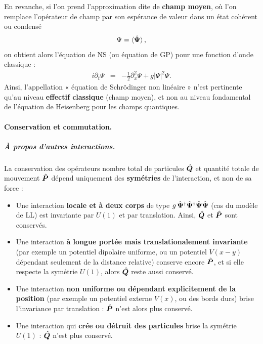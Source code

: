 \medskip

En revanche, si l’on prend l’approximation dite de {\bf champ moyen}, où l’on remplace l’opérateur de champ par son espérance de valeur dans un état cohérent ou condensé
\begin{eqnarray}
	\Psi = \braket{\hat{\bm{\Psi}}},		
\end{eqnarray}
on obtient alors l’équation de \gls{NS} (ou équation de  \gls{GP}) pour une fonction d’onde classique :
\begin{eqnarray}\label{chap.1:eq.GP.2}
	i \partial_t \Psi	 & = & - \frac{1}{2}\partial_x^2 \Psi + g \vert \Psi \vert^2  \Psi.
\end{eqnarray}
Ainsi, l’appellation « équation de Schrödinger non linéaire » n’est pertinente qu’au niveau {\bf effectif classique} (champ moyen), et non au niveau fondamental de l’équation de Heisenberg pour les champs quantiques.




\paragraph{Conservation et commutation.}

\subparagraph{À propos d’autres interactions.}

La conservation des opérateurs nombre total de particules $\hat{\bm{Q}}$ et quantité totale de mouvement $\hat{\bm{P}}$ dépend uniquement des \textbf{symétries} de l’interaction, et non de sa force :  

\begin{itemize}[label = $\bullet$]
    \item Une interaction \textbf{locale et à deux corps} de type $g \, \hat{\bm{\Psi}}^\dagger \hat{\bm{\Psi}}^\dagger \hat{\bm{\Psi}} \hat{\bm{\Psi}}$ (cas du modèle de \gls{LL}) est invariante par $U(1)$ et par translation. Ainsi, $\hat{\bm{Q}}$ et $\hat{\bm{P}}$ sont conservés.  

    \item Une interaction \textbf{à longue portée mais translationalement invariante} (par exemple un potentiel dipolaire uniforme, ou un potentiel $V(x-y)$ dépendant seulement de la distance relative) conserve encore $\hat{\bm{P}}$, et si elle respecte la symétrie $U(1)$, alors $\hat{\bm{Q}}$ reste aussi conservé.  

    \item Une interaction \textbf{non uniforme ou dépendant explicitement de la position} (par exemple un potentiel externe $V(x)$, ou des bords durs) brise l’invariance par translation : $\hat{\bm{P}}$ n’est alors plus conservé.  

    \item Une interaction qui \textbf{crée ou détruit des particules} brise la symétrie $U(1)$ : $\hat{\bm{Q}}$ n’est plus conservé.  
\end{itemize}

